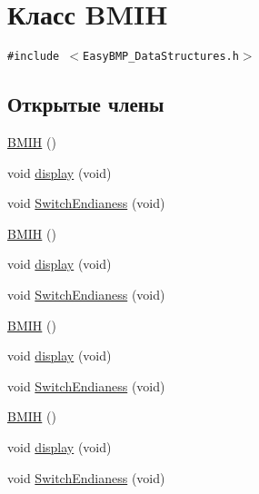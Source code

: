\hypertarget{class_b_m_i_h}{
\section{Класс BMIH}
\label{class_b_m_i_h}
}
{\tt \#include $<$EasyBMP\_\-DataStructures.h$>$}

\subsection*{Открытые члены}
\begin{CompactItemize}
\item 
\hyperlink{class_b_m_i_h_f16a14a7fe56a28349067fe18858f9f3}{BMIH} ()
\item 
void \hyperlink{class_b_m_i_h_3204317506996229b6fefaacbb2d79cb}{display} (void)
\item 
void \hyperlink{class_b_m_i_h_ece3c1b46fe1712b5926d0b47eb1739f}{SwitchEndianess} (void)
\item 
\hyperlink{class_b_m_i_h_f16a14a7fe56a28349067fe18858f9f3}{BMIH} ()
\item 
void \hyperlink{class_b_m_i_h_3204317506996229b6fefaacbb2d79cb}{display} (void)
\item 
void \hyperlink{class_b_m_i_h_ece3c1b46fe1712b5926d0b47eb1739f}{SwitchEndianess} (void)
\item 
\hyperlink{class_b_m_i_h_f16a14a7fe56a28349067fe18858f9f3}{BMIH} ()
\item 
void \hyperlink{class_b_m_i_h_3204317506996229b6fefaacbb2d79cb}{display} (void)
\item 
void \hyperlink{class_b_m_i_h_ece3c1b46fe1712b5926d0b47eb1739f}{SwitchEndianess} (void)
\item 
\hyperlink{class_b_m_i_h_f16a14a7fe56a28349067fe18858f9f3}{BMIH} ()
\item 
void \hyperlink{class_b_m_i_h_3204317506996229b6fefaacbb2d79cb}{display} (void)
\item 
void \hyperlink{class_b_m_i_h_ece3c1b46fe1712b5926d0b47eb1739f}{SwitchEndianess} (void)
\end{CompactItemize}
